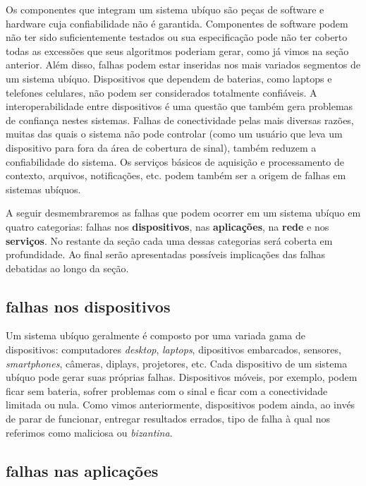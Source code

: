Os componentes que integram um sistema ubíquo são peças de software e hardware cuja confiabilidade não é garantida. Componentes de software podem não ter sido suficientemente testados ou sua especificação pode não ter coberto todas as excessões que seus algoritmos poderiam gerar, como já vimos na seção anterior. Além disso, falhas podem estar inseridas nos mais variados segmentos de um sistema ubíquo. Dispositivos que dependem de baterias, como laptops e telefones celulares, não podem ser considerados totalmente confiáveis. A interoperabilidade entre dispositivos é uma questão que também gera problemas de confiança nestes sistemas. Falhas de conectividade pelas mais diversas razões, muitas das quais o sistema não pode controlar (como um usuário que leva um dispositivo para fora da área de cobertura de sinal), também reduzem a confiabilidade do sistema. Os serviços básicos de aquisição e processamento de contexto, arquivos, notificações, etc. podem também ser a origem de falhas em sistemas ubíquos.

A seguir desmembraremos as falhas que podem ocorrer em um sistema ubíquo em quatro categorias: falhas nos \textbf{dispositivos}, nas \textbf{aplicações}, na \textbf{rede} e nos \textbf{serviços}. No restante da seção cada uma dessas categorias será coberta em profundidade. Ao final serão apresentadas possíveis implicações das falhas debatidas ao longo da seção.

\subsection{falhas nos dispositivos} %
\label{sub:falhas_nos_dispositivos}

Um sistema ubíquo geralmente é composto por uma variada gama de dispositivos: computadores \emph{desktop}, \emph{laptops}, dipositivos embarcados, sensores, \emph{smartphones}, câmeras, diplays, projetores, etc. Cada dispositivo de um sistema ubíquo pode gerar suas próprias falhas. Dispositivos móveis, por exemplo, podem ficar sem bateria, sofrer problemas com o sinal e ficar com a conectividade limitada ou nula. Como vimos anteriormente, dispositivos podem ainda, ao invés de parar de funcionar, entregar resultados errados, tipo de falha à qual nos referimos como maliciosa ou \emph{bizantina}.


\subsection{falhas nas aplicações} %
\label{sub:falhas_nas_aplicacoes}

